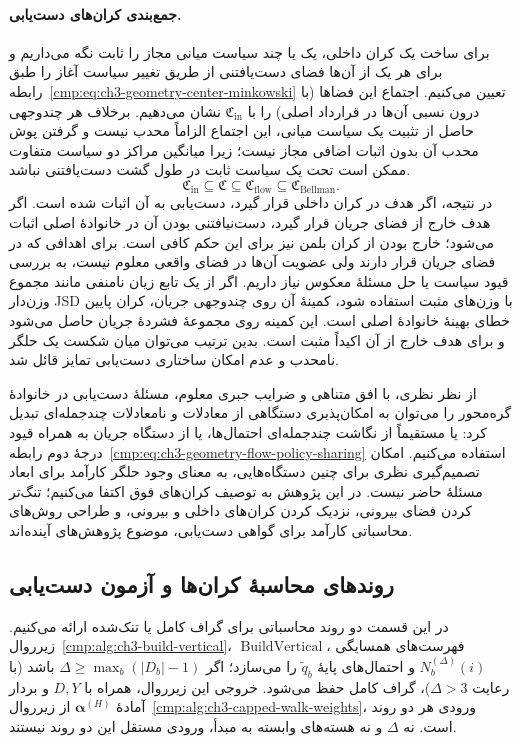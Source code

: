 \paragraph{جمع‌بندی کران‌های دست‌یابی.}
برای ساخت یک کران داخلی، یک یا چند سیاست میانی مجاز را ثابت نگه می‌داریم و برای هر یک از آن‌ها فضای دست‌یافتنی از طریق تغییر سیاست آغاز را طبق رابطه~\eqref{cmp:eq:ch3-geometry-center-minkowski} تعیین می‌کنیم. اجتماع این فضاها (با درون نسبی آن‌ها در قرارداد اصلی) را با $\mathfrak C_{\mathrm{in}}$ نشان می‌دهیم. برخلاف هر چندوجهی حاصل از تثبیت یک سیاست میانی، این اجتماع الزاماً محدب نیست و گرفتن پوش محدب آن بدون اثبات اضافی مجاز نیست؛ زیرا میانگین مراکز دو سیاست متفاوت ممکن است تحت یک سیاست ثابت در طول گشت دست‌یافتنی نباشد.
\begin{equation}\label{cmp:eq:ch3-geometry-attainability-sandwich}
\boxed{\mathfrak C_{\mathrm{in}}\subseteq\mathfrak C\subseteq\mathfrak C_{\mathrm{flow}}\subseteq\mathfrak C_{\mathrm{Bellman}}.}
\end{equation}
در نتیجه، اگر هدف در کران داخلی قرار گیرد، دست‌یابی به آن اثبات شده است. اگر هدف خارج از فضای جریان قرار گیرد، دست‌نیافتنی بودن آن در خانوادهٔ اصلی اثبات می‌شود؛ خارج بودن از کران بلمن نیز برای این حکم کافی است. برای اهدافی که در فضای جریان قرار دارند ولی عضویت آن‌ها در فضای واقعی معلوم نیست، به بررسی قیود سیاست یا حل مسئلهٔ معکوس نیاز داریم. اگر از یک تابع زیان نامنفی مانند مجموع وزن‌دار JSD با وزن‌های مثبت استفاده شود، کمینهٔ آن روی چندوجهی جریان، کران پایین خطای بهینهٔ خانوادهٔ اصلی است. این کمینه روی مجموعهٔ فشردهٔ جریان حاصل می‌شود و برای هدف خارج از آن اکیداً مثبت است. بدین ترتیب می‌توان میان شکست یک حلگر نامحدب و عدم امکان ساختاری دست‌یابی تمایز قائل شد.

از نظر نظری، با افق متناهی و ضرایب جبری معلوم، مسئلهٔ دست‌یابی در خانوادهٔ گره‌محور را می‌توان به امکان‌پذیری دستگاهی از معادلات و نامعادلات چندجمله‌ای تبدیل کرد: یا مستقیماً از نگاشت چندجمله‌ای احتمال‌ها، یا از دستگاه جریان به همراه قیود درجهٔ دوم رابطه~\eqref{cmp:eq:ch3-geometry-flow-policy-sharing} استفاده می‌کنیم. امکان تصمیم‌گیری نظری برای چنین دستگاه‌هایی، به معنای وجود حلگر کارآمد برای ابعاد مسئلهٔ حاضر نیست. در این پژوهش به توصیف کران‌های فوق اکتفا می‌کنیم؛ تنگ‌تر کردن فضای بیرونی، نزدیک کردن کران‌های داخلی و بیرونی، و طراحی روش‌های محاسباتی کارآمد برای گواهی دست‌یابی، موضوع پژوهش‌های آینده‌اند.

\subsection{روندهای محاسبهٔ کران‌ها و آزمون دست‌یابی}
\label{app:geometry-attainability-algorithms}
در این قسمت دو روند محاسباتی برای گراف کامل یا تنک‌شده ارائه می‌کنیم. زیرروال~\ref{cmp:alg:ch3-build-vertical}، $\operatorname{BuildVertical}$، فهرست‌های همسایگی $N_b^{(\Delta)}(i)$ و احتمال‌های پایهٔ $\widetilde q_b$ را می‌سازد؛ اگر $\Delta\ge\max_b(|D_b|-1)$ باشد (با رعایت $\Delta>3$)، گراف کامل حفظ می‌شود. خروجی این زیرروال، همراه با $D,Y$ و بردار آمادهٔ $\boldsymbol\alpha^{(H)}$ از زیرروال~\ref{cmp:alg:ch3-capped-walk-weights}، ورودی هر دو روند است. نه $\Delta$ و نه هسته‌های وابسته به مبدأ، ورودی مستقل این دو روند نیستند.

